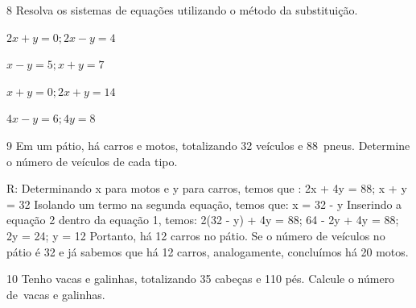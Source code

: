 





\num{8} Resolva os sistemas de equações utilizando o método da substituição.


\begin{escolha}
\item $2x + y = 0; 2x - y = 4$
\item $x - y = 5; x + y = 7$
\item $x + y = 0; 2x + y = 14$
\item $4x - y = 6; 4y = 8$
\end{escolha}


\num{9} Em um pátio, há carros e motos, totalizando 32 veículos e 88~pneus.
Determine o número de veículos de cada tipo.

R: Determinando x para motos e y para carros, temos que :
2x + 4y = 88; x + y = 32
Isolando um termo na segunda equação, temos que: x = 32 - y
Inserindo a equação 2 dentro da equação 1, temos:
2(32 - y) + 4y = 88; 64 - 2y + 4y = 88; 2y = 24; y = 12
Portanto, há 12 carros no pátio.
Se o número de veículos no pátio é 32 e já sabemos que há 12 carros,
analogamente, concluímos há 20 motos.

\num{10} Tenho vacas e galinhas, totalizando 35 cabeças e 110 pés. Calcule o
número de~vacas e galinhas.






